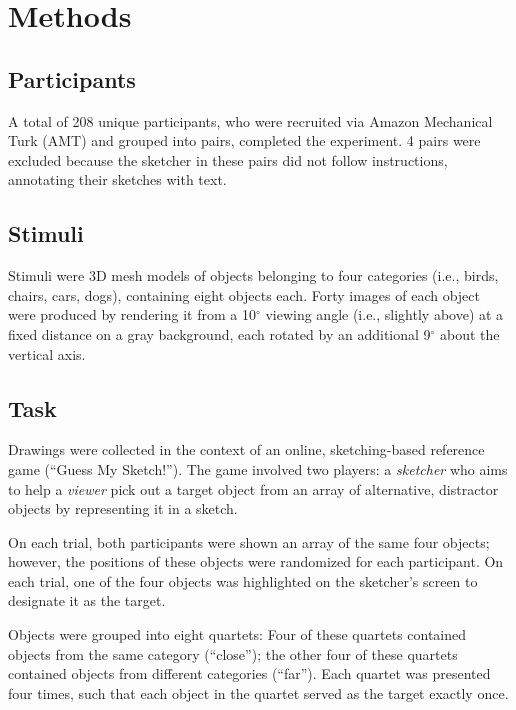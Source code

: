 \documentclass[manuscript]{stjour}
\begin{document}
\section*{Methods}

\subsection*{Participants}

A total of 208 unique participants, who were recruited via Amazon Mechanical Turk (AMT) and grouped into pairs, completed the experiment. 4 pairs were excluded because the sketcher in these pairs did not follow instructions, annotating their sketches with text. 

\subsection*{Stimuli}

Stimuli were 3D mesh models of objects belonging to four categories (i.e., birds, chairs, cars, dogs), containing eight objects each. Forty images of each object were produced by rendering it from a 10$^{\circ}$ viewing angle (i.e., slightly above) at a fixed distance on a gray background, each rotated by an additional 9$^{\circ}$ about the vertical axis. 

\subsection*{Task}

Drawings were collected in the context of an online, sketching-based reference game (``Guess My Sketch!''). The game involved two players: a \textit{sketcher} who aims to help a \textit{viewer} pick out a target object from an array of alternative, distractor objects by representing it in a sketch. 

On each trial, both participants were shown an array of the same four objects; however, the positions of these objects were randomized for each participant. On each trial, one of the four objects was highlighted on the sketcher's screen to designate it as the target. 

Objects were grouped into eight quartets: Four of these quartets contained objects from the same category (``close''); the other four of these quartets contained objects from different categories (``far''). Each quartet was presented four times, such that each object in the quartet served as the target exactly once.
\end{document}
